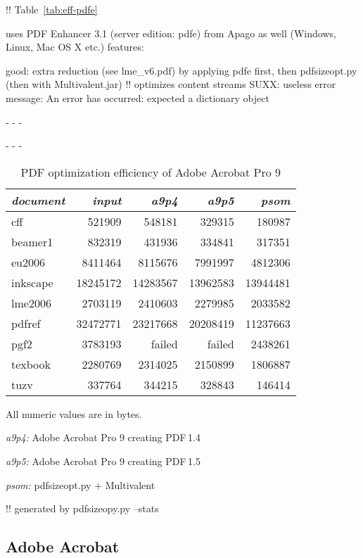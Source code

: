 \documentclass{ltugproc}
\def\cmd{\textsf}
\def\captiontop#1{%
  \advance\abovecaptionskip-\belowcaptionskip
  \advance\belowcaptionskip\abovecaptionskip
  \advance\abovecaptionskip-\belowcaptionskip
  \abovecaptionskip-\abovecaptionskip
  \caption{#1}%
  \advance\abovecaptionskip-\belowcaptionskip
  \advance\belowcaptionskip\abovecaptionskip
  \advance\abovecaptionskip-\belowcaptionskip
  \abovecaptionskip-\abovecaptionskip
}
\begin{document}
!! Table~\ref{tab:eff-pdfe}

uses PDF Enhancer 3.1 (server edition: pdfe) from Apago as well (Windows, Linux, Mac OS X etc.)
  features:

  good: extra reduction (see lme\_v6.pdf) by applying pdfe first, then
    pdfsizeopt.py (then with Multivalent.jar)
  !! optimizes content streams
  SUXX: useless error message:
   An error has occurred:  expected a dictionary object

\begin{table}
\captiontop{PDF optimization efficiency
of Adobe Acrobat Pro 9}\label{tab:eff-a9}
\par\small\noindent\hfil
\advance\tabcolsep-2pt  %
\begin{tabular}{@{}lrrrr@{}}
\toprule
\emph{document} & \emph{input} & \emph{a9p4} & \emph{a9p5} & \emph{psom} \\\midrule
cff         &   521909 &   548181 &   329315 &   180987 \\
beamer1     &   832319 &   431936 &   334841 &   317351 \\
eu2006      &  8411464 &  8115676 &  7991997 &  4812306 \\
inkscape    & 18245172 & 14283567 & 13962583 & 13944481 \\
lme2006     &  2703119 &  2410603 &  2279985 &  2033582 \\
pdfref      & 32472771 & 23217668 & 20208419 & 11237663 \\
pgf2        &  3783193 &   failed &   failed &  2438261 \\
texbook     &  2280769 &  2314025 &  2150899 &  1806887 \\
tuzv        &   337764 &   344215 &   328843 &   146414 \\
\bottomrule
\end{tabular}
\par\bigskip
\par\noindent All numeric values are in bytes.
\par\noindent\emph{a9p4:} Adobe Acrobat Pro 9 creating PDF\,1.4
\par\noindent\emph{a9p5:} Adobe Acrobat Pro 9 creating PDF\,1.5
\par\noindent\emph{psom:} \cmd{pdfsizeopt.py} $+$ Multivalent
\end{table}



!! generated by pdfsizeopy.py --stats

\subsection{Adobe Acrobat}
\end{document}
